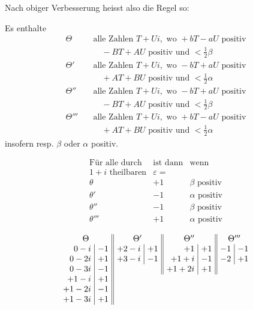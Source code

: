 Nach obiger Verbesserung heisst also die Regel so:\par
Es enthalte
\[
\begin{aligned}
\Theta\quad&\text{alle Zahlen }T+Ui,\text{ wo }+bT-aU\text{ positiv}\\
&\quad -BT+AU\text{ positiv und }<\tfrac12\beta\\
\Theta'\quad&\text{alle Zahlen }T+Ui,\text{ wo }-bT+aU\text{ positiv}\\
&\quad +AT+BU\text{ positiv und }<\tfrac12\alpha\\
\Theta''\quad&\text{alle Zahlen }T+Ui,\text{ wo }-bT+aU\text{ positiv}\\
&\quad -BT+AU\text{ positiv und }<\tfrac12\beta\\
\Theta'''\quad&\text{alle Zahlen }T+Ui,\text{ wo }+bT-aU\text{ positiv}\\
&\quad +AT+BU\text{ positiv und }<\tfrac12\alpha
\end{aligned}
\]
insofern resp. $\beta$ oder $\alpha$ positiv.

\[
\begin{array}{c|c|l}
\text{Für alle durch}&\text{ist dann}&\text{wenn}\\
1+i\text{ theilbaren}&\varepsilon=&\\
\theta&+1&\beta\text{ positiv}\\
\theta'&-1&\alpha\text{ positiv}\\
\theta''&-1&\beta\text{ positiv}\\
\theta'''&+1&\alpha\text{ positiv}
\end{array}
\]

\[
\setlength{\arraycolsep}{4pt}
\begin{array}{r|r||r|r||r|r||r|r}
\multicolumn{2}{c||}{\Theta}&\multicolumn{2}{c||}{\Theta'}&\multicolumn{2}{c||}{\Theta''}&\multicolumn{2}{c}{\Theta'''}\\
0-i&-1&+2-i&+1&+1&+1&-1&-1\\
0-2i&+1&+3-i&-1&+1+i&-1&-2&+1\\
0-3i&-1&\multicolumn{2}{c||}{}&+1+2i&+1&\multicolumn{2}{c}{}\\
+1-i&+1&\multicolumn{6}{c}{}\\
+1-2i&-1&\multicolumn{6}{c}{}\\
+1-3i&+1&\multicolumn{6}{c}{}
\end{array}
\]

\begin{center}
\resizebox{.86\textwidth}{!}{}
\end{center}
